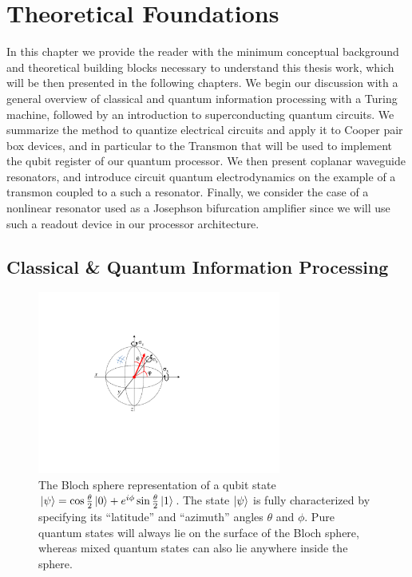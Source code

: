 \chapter{Theoretical Foundations} \label{chapter:theory}

In this chapter we provide the reader with the minimum conceptual background and theoretical building blocks necessary  to understand this thesis work, which will be then presented in the following chapters. We begin our discussion with a general overview of classical and quantum information processing with a Turing machine, followed by an introduction to superconducting quantum circuits. We summarize the method to quantize electrical circuits and apply it to Cooper pair box devices, and in particular to the Transmon that will be used to implement the qubit register of our quantum processor. We then present coplanar waveguide resonators, and introduce circuit quantum electrodynamics on the example of a transmon coupled to a such a resonator. Finally, we consider the case of a nonlinear resonator used as a Josephson bifurcation amplifier since we will use such a readout device in our processor architecture.

\section{Classical \& Quantum Information Processing}

\begin{figure}
	\includegraphics[width=8cm]{"./material/figures/introduction/bloch_sphere"}
	\caption{The Bloch sphere representation of a qubit state $\left| \psi \right> = \cos{\frac{\theta}{2}}\left| 0 \right>+e^{i\phi}\sin{\frac{\theta}{2}}\left| 1 \right>$. The state $\left| \psi \right>$ is fully characterized by specifying its ``latitude'' and ``azimuth'' angles $\theta$ and $\phi$. Pure quantum states will always lie on the surface of the Bloch sphere, whereas mixed quantum states can also lie anywhere inside the sphere.}
	\label{fig:BlochSphere}
\end{figure}

